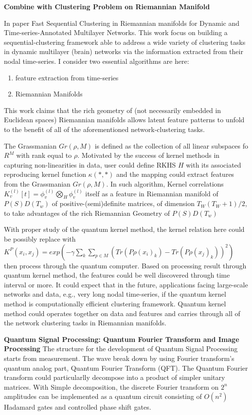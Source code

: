 \documentclass{article}
\begin{document}
\textbf{Combine with Clustering Problem on Riemannian Manifold}

In paper Fast Sequential Clustering in Riemannian
manifolds for Dynamic and Time-series-Annotated Multilayer Networks. This
work focus on building a sequential-clustering framework able to address
a wide variety of clustering tasks in dynamic multilayer (brain) networks
via the information extracted from their nodal time-series.
I consider two essential algorithms are here:
\begin{enumerate}
  \item feature extraction from time-series
  \item Riemannian Manifolds
\end{enumerate}
This work claims that the rich geometry of 
(not necessarily embedded in Euclidean spaces) Riemannian manifolds 
allows latent feature patterns to unfold to the benefit of all of 
the aforementioned network-clustering tasks.

The Grassmanian $Gr(\rho, M)$ is defined as the collection 
of all linear subspaces fo $R^M$ with rank equal to $\rho$. 
Motivated by the success of kernel methods in capturing 
non-linearities in data, user could define RKHS $H$ with its associated
reproducing kernel function $\kappa(*,*)$ and the mapping 
could extract features from the Grassmanian $Gr(\rho, M)$. In such 
algorithm, Kernel correlations 
$K_v^{(l)}[t] = \phi_v^{(l)} \bigotimes_H \phi_v^{(l)}$ itself 
as a feature in Riemannian manifold of $P(S)D(T_w)$ of 
positive-(semi)definite matrices, of dimension $T_W (T_W+1)/2$,
to take advantages of the rich Riemannian Geometry of $P(S)D(T_w)$

With proper study of the quantum kernel method, the kernel relation 
here could be possibly replace with $
  K^P (x_i,x_j) = exp(-\gamma \sum_k \sum_{p \in M} 
  (Tr(P \rho(x_i)_k)-Tr(P \rho(x_j)_k))^2)
$
then process through the quantum computer. Based on processing 
result through quantum kernel method, the features could be well 
discovered through time interval or more. It could expect that in 
the future, applications facing large-scale networks and data, e.g., very long 
nodal time-series, if the quantum kernel method is computationally efficient clustering 
framework.  Quantum kernel method could operates together 
on data and features 
and carries through all of the network clustering tasks in 
Riemannian manifolds. 

\textbf{Quantum Signal Processing: Quantum Fourier Transform and Image Processing}\newline
The structure for the development of Quantum Signal Processing starts from
measurement. The wave break down by using Fourier transform's quantum analog
part, Quantum Fourier Transform (QFT). The Quantum Fourier transform could
particularlly decompose into a product of simpler unitary matrices.
With Simple decomposition, the discrete Fourier transform on $2^n$ amplitudes
can be implemented as a quantum circuit consisting of $O(n^2)$ Hadamard
gates and controlled phase shift gates. 
\end{document}
